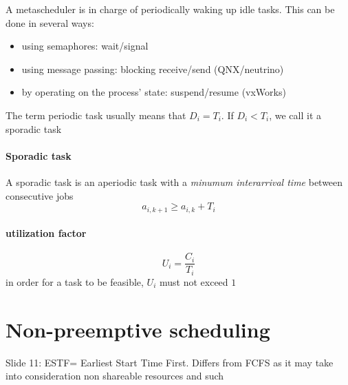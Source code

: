 \documentclass{book}
\begin{document}
A metascheduler is in charge of periodically waking up idle tasks. This can be done in several ways: 
\begin{itemize}
    \item using semaphores: wait/signal
    \item using message passing: blocking receive/send (QNX/neutrino)
    \item by operating on the process' state: suspend/resume (vxWorks)
\end{itemize}
The term periodic task usually means that $D_i=T_i$. If $D_i<T_i$, we call it a sporadic task
\subsubsection{Sporadic task}
A sporadic task is an aperiodic task with a \emph{minumum interarrival time} between consecutive jobs
\[a_{i,k+1} \geq a_{i,k}+T_i\]
\subsubsection{utilization factor}
 \[U_i= \frac{C_i}{T_i}\]
 in order for a task to be feasible, $U_i$ must not exceed $1$


 \chapter{Non-preemptive scheduling}
 Slide 11: ESTF= Earliest Start Time First. Differs from FCFS as it may take into consideration non shareable resources and such
\end{document}
